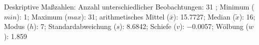 				\label{tableValues:asys01a_o}
				\vspace*{-\baselineskip}
                    \begin{noten}
                	    \note{} Deskriptive Maßzahlen:
                	    Anzahl unterschiedlicher Beobachtungen: 31%
                	    ; 
                	      Minimum ($min$): 1; 
                	      Maximum ($max$): 31; 
                	      arithmetisches Mittel ($\bar{x}$): \num[round-mode=places,round-precision=2]{15.7727}; 
                	      Median ($\tilde{x}$): 16; 
                	      Modus ($h$): 7; 
                	      Standardabweichung ($s$): \num[round-mode=places,round-precision=2]{8.6842}; 
                	      Schiefe ($v$): \num[round-mode=places,round-precision=2]{-0.0057}; 
                	      Wölbung ($w$): \num[round-mode=places,round-precision=2]{1.859}
                     \end{noten}

